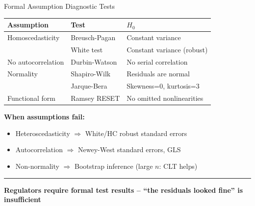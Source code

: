 \documentclass[8pt,aspectratio=169]{beamer}
\newcommand{\bottomnote}[1]{%
\vfill
\vspace{-2mm}
\textcolor{mllavender2}{\rule{\textwidth}{0.4pt}}
\vspace{1mm}
\footnotesize
\textbf{#1}
}
\begin{document}
\begin{frame}[t]{Formal Assumption Diagnostic Tests}
\begin{tabular}{lll}
\toprule
\textbf{Assumption} & \textbf{Test} & \textbf{$H_0$} \\
\midrule
Homoscedasticity & Breusch-Pagan & Constant variance \\
 & White test & Constant variance (robust) \\
No autocorrelation & Durbin-Watson & No serial correlation \\
Normality & Shapiro-Wilk & Residuals are normal \\
 & Jarque-Bera & Skewness=0, kurtosis=3 \\
Functional form & Ramsey RESET & No omitted nonlinearities \\
\bottomrule
\end{tabular}

\vspace{0.3cm}
\textbf{When assumptions fail:}
\begin{itemize}
  \item Heteroscedasticity $\Rightarrow$ White/HC robust standard errors
  \item Autocorrelation $\Rightarrow$ Newey-West standard errors, GLS
  \item Non-normality $\Rightarrow$ Bootstrap inference (large $n$: CLT helps)
\end{itemize}

\bottomnote{Regulators require formal test results -- ``the residuals looked fine'' is insufficient}
\end{frame}
\end{document}
